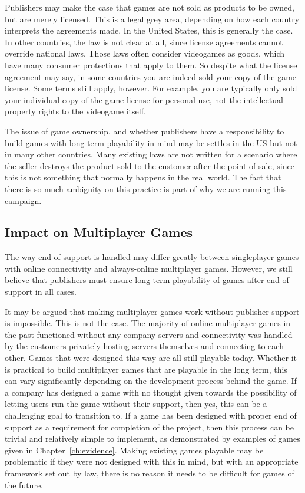 Publishers may make the case that games are not sold as products to be owned, but are merely licensed.
This is a legal grey area, depending on how each country interprets the agreements made.
In the United States, this is generally the case\cn.
In other countries, the law is not clear at all, since license agreements cannot override national laws.
Those laws often consider videogames as goods, which have many consumer protections that apply to them\cn.
So despite what the license agreement may say, in some countries you are indeed sold your copy of the game license.
Some terms still apply, however.
For example, you are typically only sold your individual copy of the game license for personal use, not the intellectual property rights to the videogame itself.

The issue of game ownership, and whether publishers have a responsibility to build games with long term playability in mind may be settles in the US but not in many other countries\cn.
Many existing laws are not written for a scenario where the seller destroys the product sold to the customer after the point of sale,
since this is not something that normally happens in the real world.
The fact that there is so much ambiguity on this practice is part of why we are running this campaign.


\subsection{Impact on Multiplayer Games}
The way end of support is handled may differ greatly between singleplayer games with online connectivity and always-online multiplayer games.
However, we still believe that publishers must ensure long term playability of games after end of support in all cases.

It may be argued that making multiplayer games work without publisher support is impossible.
This is not the case.
The majority of online multiplayer games in the past functioned without any company servers
and connectivity was handled by the customers privately hosting servers themselves and connecting to each other.
Games that were designed this way are all still playable today.
Whether it is practical to build multiplayer games that are playable in the long term, this can vary significantly depending on the development process behind the game.
If a company has designed a game with no thought given towards the possibility of letting users run the game without their support, then yes,
this can be a challenging goal to transition to.
If a game has been designed with proper end of support as a requirement for completion of the project, then this process can be trivial and relatively simple to implement,
as demonstrated by examples of games given in Chapter~\ref{ch:evidence}.
Making existing games playable may be problematic if they were not designed with this in mind,
but with an appropriate framework set out by law, there is no reason it needs to be difficult for games of the future.

